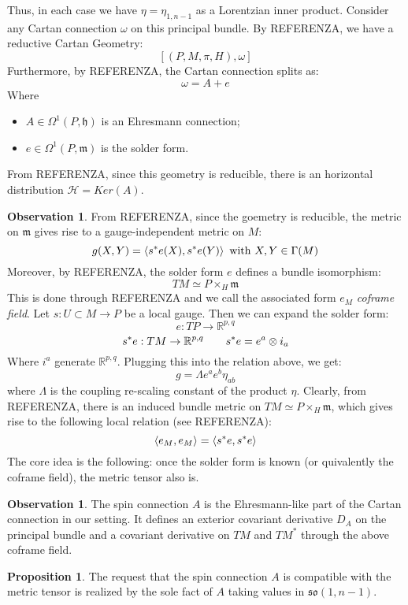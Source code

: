 \documentclass[12pt,a4paper]{report}
\theoremstyle{definition}
\theoremstyle{Theorem}
\newtheorem{Prop}[Def]{Proposition}
\theoremstyle{definition}
\theoremstyle{definition}
\newtheorem{Obs}[Def]{Observation}
\begin{document}
	Thus, in each case we have $\eta=\eta_{1,n-1}$ as a Lorentzian inner product. Consider any Cartan connection $\omega$ on this principal bundle. By REFERENZA, we have a reductive Cartan Geometry:
		$$[(P,M,\pi,H),\omega]$$
	Furthermore, by REFERENZA, the Cartan connection splits as:
	$$\omega=A+e$$
	Where 
	\begin{itemize}
		\item $A\in\Omega^1(P,\mathfrak{h})$ is an Ehresmann connection;
		\item $e\in\Omega^1(P,\mathfrak{m})$ is the solder form.
	\end{itemize}
	From REFERENZA, since this geometry is reducible, there is an horizontal distribution $\mathcal{H}=Ker(A)$.\\
	\begin{Obs}
		From REFERENZA, since the goemetry is reducible, the metric on $\mathfrak{m}$ gives rise to a gauge-independent metric on $M$:
		$$g(X,Y)=\braket{s^*e(X),s^*e(Y)}\hbox{ with }X,Y\in\Gamma(M)$$
		Moreover, by REFERENZA, the solder form $e$ defines a bundle isomorphism:
		$$TM\simeq P\times_H \mathfrak{m}$$
		This is done through REFERENZA and we call the associated form $e_M$ \textit{coframe field}.
		Let $s:U\subset M\rightarrow P$ be a local gauge. Then we can expand the solder form:
		$$e:TP\rightarrow \mathbb{R}^{p,q}$$
		$$s^*e:TM\rightarrow \mathbb{R}^{p,q}\hspace{20 pt}s^*e=e^a\otimes i_a$$
		Where $i^a$ generate $\mathbb{R}^{p,q}$. Plugging this into the relation above, we get:
		$$g=\Lambda e^ae^b\eta_{ab}$$
		where $\Lambda$ is the coupling re-scaling constant of the product $\eta$. Clearly, from REFERENZA, there is an induced bundle metric on $TM\simeq P\times_H \mathfrak{m}$, which gives rise to the following local relation (see REFERENZA):
		$$\braket{e_M,e_M}=\braket{s^*e,s^*e}$$
		The core idea is the following: once the solder form is known (or quivalently the coframe field), the metric tensor also is.
	\end{Obs}
	\begin{Obs}
		The spin connection $A$ is the Ehresmann-like part of the Cartan connection in our setting. It defines an exterior covariant derivative $D_A$ on the principal bundle and a covariant derivative on $TM$ and $TM^*$ through the above coframe field. 
	\end{Obs}
	\begin{Prop}
		The request that the spin connection $A$ is compatible with the metric tensor is realized by the sole fact of $A$ taking values in $\mathfrak{so}(1,n-1)$.
	\end{Prop}
\end{document}
